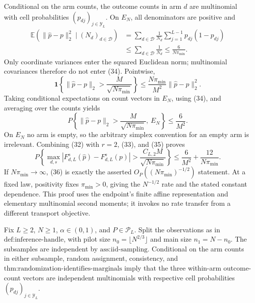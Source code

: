 Conditional on the arm counts, the outcome counts in arm \(d\) are multinomial with cell probabilities \((p_{dj})_{j\in\mathcal Y_L}\).  On \(E_N\), all denominators are positive and
\[
\begin{aligned}
 \mathbb E\!\left(\|\widehat p-p\|_2^2\mid(N_d)_{d\in\mathcal D}\right)
 &=\sum_{d\in\mathcal D}\frac1{N_d}
   \sum_{j=1}^{L-1}p_{dj}(1-p_{dj})\\
 &\leq\sum_{d\in\mathcal D}\frac1{N_d}
 \leq\frac6{N\pi_{\min}}.                                                 \tag{34}
\end{aligned}
\]
Only coordinate variances enter the squared Euclidean norm; multinomial covariances therefore do not enter (34).  Pointwise,
\[
 \mathbf 1\!\left\{\|\widehat p-p\|_2>
       \frac{M}{\sqrt{N\pi_{\min}}}\right\}
 \leq\frac{N\pi_{\min}}{M^2}\|\widehat p-p\|_2^2.
\]
Taking conditional expectations on count vectors in \(E_N\), using (34), and averaging over the counts yields
\[
 P\!\left\{\|\widehat p-p\|_2>
       \frac{M}{\sqrt{N\pi_{\min}}},\ E_N\right\}
 \leq\frac6{M^2}.                                                          \tag{35}
\]
On \(E_N\) no arm is empty, so the arbitrary simplex convention for an empty arm is irrelevant.  Combining (32) with \(r=2\), (33), and (35) proves
\[
 P\!\left\{
 \max_{d,s}|F_{d,L}^s(\widehat p)-F_{d,L}^s(p)|>
 \frac{C_{L,2}M}{\sqrt{N\pi_{\min}}}
 \right\}
 \leq\frac6{M^2}+\frac{12}{N\pi_{\min}}.                                 \tag{36}
\]
If \(N\pi_{\min}\to\infty\), (36) is exactly the asserted \(O_P((N\pi_{\min})^{-1/2})\) statement.  At a fixed law, positivity fixes \(\pi_{\min}>0\), giving the \(N^{-1/2}\) rate and the stated constant dependence.  This proof uses the endpoint's finite affine representation and elementary multinomial second moments; it invokes no rate transfer from a different transport objective.

Fix \(L\geq2\), \(N\geq1\), \(\alpha\in(0,1)\), and \(P\in\mathcal P_L\).  Split the observations as in \(\text{def:inference-handle}\), with pilot size \(n_0=\lfloor N^{2/3}\rfloor\) and main size \(n_1=N-n_0\).  The subsamples are independent by \(\text{ass:iid-sampling}\).  Conditional on the arm counts in either subsample, random assignment, consistency, and \(\text{thm:randomization-identifies-marginals}\) imply that the three within-arm outcome-count vectors are independent multinomials with respective cell probabilities \((p_{dj})_{j\in\mathcal Y_L}\).


